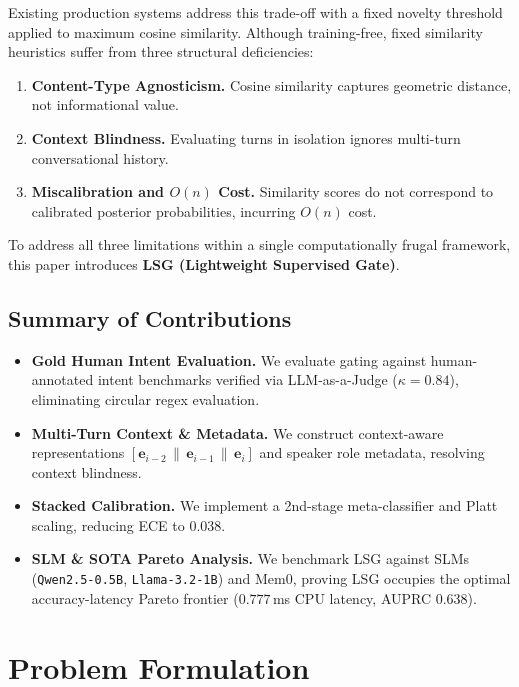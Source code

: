 \documentclass[journal]{IEEEtran}
\begin{document}
Existing production systems address this trade-off with a fixed novelty threshold applied to maximum cosine similarity.
Although training-free, fixed similarity heuristics suffer from three structural deficiencies:
\begin{enumerate}
  \item \textbf{Content-Type Agnosticism.} Cosine similarity captures geometric distance, not informational value.
  \item \textbf{Context Blindness.} Evaluating turns in isolation ignores multi-turn conversational history.
  \item \textbf{Miscalibration and $O(n)$ Cost.} Similarity scores do not correspond to calibrated posterior probabilities, incurring $O(n)$ cost.
\end{enumerate}

To address all three limitations within a single computationally frugal framework, this paper introduces \textbf{LSG (Lightweight Supervised Gate)}.

\subsection*{Summary of Contributions}
\begin{itemize}
  \item \textbf{Gold Human Intent Evaluation.} We evaluate gating against human-annotated intent benchmarks verified via LLM-as-a-Judge ($\kappa{=}0.84$), eliminating circular regex evaluation.
  \item \textbf{Multi-Turn Context \& Metadata.} We construct context-aware representations $[\mathbf{e}_{i-2} \,\|\, \mathbf{e}_{i-1} \,\|\, \mathbf{e}_i]$ and speaker role metadata, resolving context blindness.
  \item \textbf{Stacked Calibration.} We implement a 2nd-stage meta-classifier and Platt scaling, reducing ECE to $0.038$.
  \item \textbf{SLM \& SOTA Pareto Analysis.} We benchmark LSG against SLMs (\texttt{Qwen2.5-0.5B}, \texttt{Llama-3.2-1B}) and Mem0, proving LSG occupies the optimal accuracy-latency Pareto frontier ($0.777$\,ms CPU latency, AUPRC $0.638$).
\end{itemize}

\section{Problem Formulation}
\end{document}
